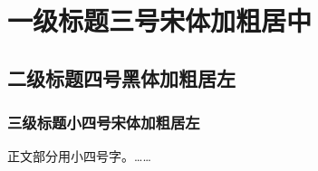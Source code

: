 \newpage
\raggedright
\setlength {\parindent }{2 em}

\onehalfspacing %
\songti {} %
\section{一级标题三号宋体加粗居中}   
\subsection{二级标题四号黑体加粗居左}
\subsubsection{三级标题小四号宋体加粗居左}
\par 正文部分用小四号字。……
